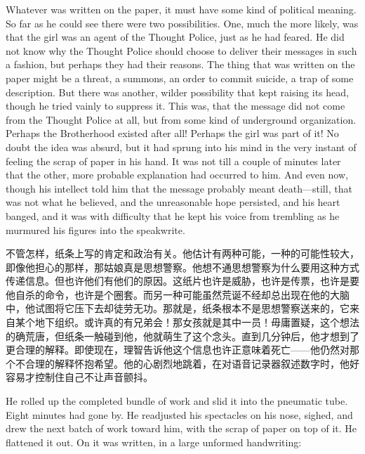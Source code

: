 \begin{paracol}{2}
Whatever was written on the paper, it must have some kind of political
meaning. So far as he could see there were two possibilities. One, much
the more likely, was that the girl was an agent of the Thought Police,
just as he had feared. He did not know why the Thought Police should
choose to deliver their messages in such a fashion, but perhaps they had
their reasons. The thing that was written on the paper might be a
threat, a summons, an order to commit suicide, a trap of some
description. But there was another, wilder possibility that kept raising
its head, though he tried vainly to suppress it. This was, that the
message did not come from the Thought Police at all, but from some kind
of underground organization. Perhaps the Brotherhood existed after all!
Perhaps the girl was part of it! No doubt the idea was absurd, but it
had sprung into his mind in the very instant of feeling the scrap of
paper in his hand. It was not till a couple of minutes later that the
other, more probable explanation had occurred to him. And even now,
though his intellect told him that the message probably meant
death---still, that was not what he believed, and the unreasonable hope
persisted, and his heart banged, and it was with difficulty that he kept
his voice from trembling as he murmured his figures into the speakwrite.

\switchcolumn

不管怎样，纸条上写的肯定和政治有关。他估计有两种可能，一种的可能性较大，即像他担心的那样，那姑娘真是思想警察。他想不通思想警察为什么要用这种方式传递信息。但也许他们有他们的原因。这纸片也许是威胁，也许是传票，也许是要他自杀的命令，也许是个圈套。而另一种可能虽然荒诞不经却总出现在他的大脑中，他试图将它压下去却徒劳无功。那就是，纸条根本不是思想警察送来的，它来自某个地下组织。或许真的有兄弟会！那女孩就是其中一员！毋庸置疑，这个想法的确荒唐，但纸条一触碰到他，他就萌生了这个念头。直到几分钟后，他才想到了更合理的解释。即使现在，理智告诉他这个信息也许正意味着死亡——他仍然对那个不合理的解释怀抱希望。他的心剧烈地跳着，在对语音记录器叙述数字时，他好容易才控制住自己不让声音颤抖。

\switchcolumn*

He rolled up the completed bundle of work and slid it into the pneumatic
tube. Eight minutes had gone by. He readjusted his spectacles on his
nose, sighed, and drew the next batch of work toward him, with the scrap
of paper on top of it. He flattened it out. On it was written, in a
large unformed handwriting:

\switchcolumn


\end{paracol}
